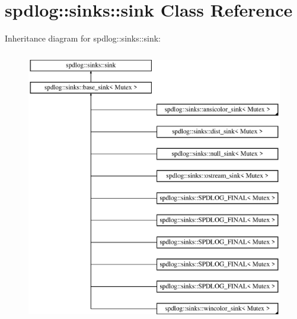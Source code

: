 \hypertarget{classspdlog_1_1sinks_1_1sink}{}\section{spdlog\+:\+:sinks\+:\+:sink Class Reference}
\label{classspdlog_1_1sinks_1_1sink}
Inheritance diagram for spdlog\+:\+:sinks\+:\+:sink\+:\begin{figure}[H]
\begin{center}
\leavevmode
\includegraphics[height=12.000000cm]{classspdlog_1_1sinks_1_1sink}
\end{center}
\end{figure}

